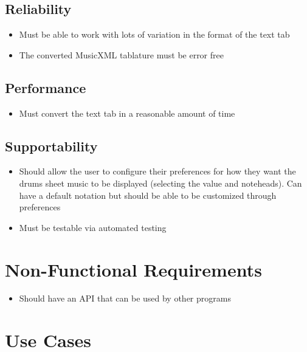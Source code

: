 \documentclass[11pt]{article}
\begin{document}
\subsection{Reliability}
\label{sec:org292e6ed}
\begin{itemize}
\item Must be able to work with lots of variation in the format of the text tab
\item The converted MusicXML tablature must be error free
\end{itemize}

\subsection{Performance}
\label{sec:org767a4e7}
\begin{itemize}
\item Must convert the text tab in a reasonable amount of time
\end{itemize}

\subsection{Supportability}
\label{sec:org8a4fcba}
\begin{itemize}
\item Should allow the user to configure their preferences for how they want the drums sheet music to be displayed (selecting the value and noteheads). Can have a default notation but should be able to be customized through preferences
\item Must be testable via automated testing
\end{itemize}

\section{Non-Functional Requirements}
\label{sec:org104c210}
\begin{itemize}
\item Should have an API that can be used by other programs
\end{itemize}

\section{Use Cases}
\label{sec:org62c2fc7}
\end{document}
